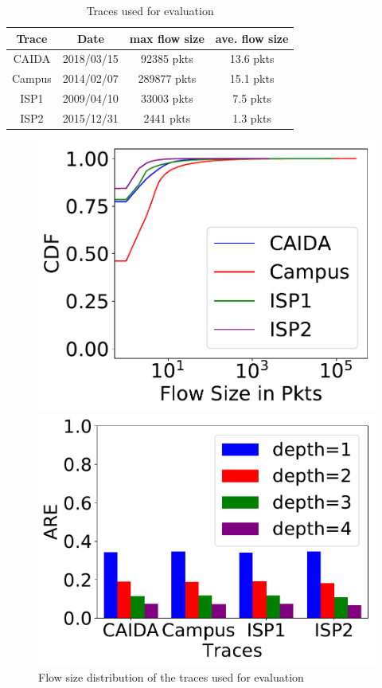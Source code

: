 \begin{table}[ht!]%
    \centering
    \caption{Traces used for evaluation}
    \label{tab:netflowtraces}
    \begin{tabular} {c | c | c | c }
    \hline\hline
    Trace & Date & max flow size & ave. flow size \\
    \hline
    CAIDA &2018/03/15&92385 pkts & 13.6 pkts\\
    Campus &2014/02/07&289877 pkts & 15.1 pkts\\
    ISP1 &2009/04/10&33003 pkts& 7.5 pkts\\
    ISP2 &2015/12/31&2441 pkts& 1.3 pkts\\
    \hline
    \end{tabular}
\end{table}

\begin{figure}
\centering
\begin{minipage}{.45\linewidth}
    \centering
    \includegraphics[width=\linewidth]{figures/exp84478/flow_size_distribution}
    \caption{Flow size distribution of the traces used for evaluation}
    \label{fig:flowsizedistribution}
\end{minipage}
\begin{minipage}{.45\linewidth}
	\centering
	\includegraphics[width=\linewidth]{figures/exp84479/are_with_depth}

\end{minipage}
\end{figure}
